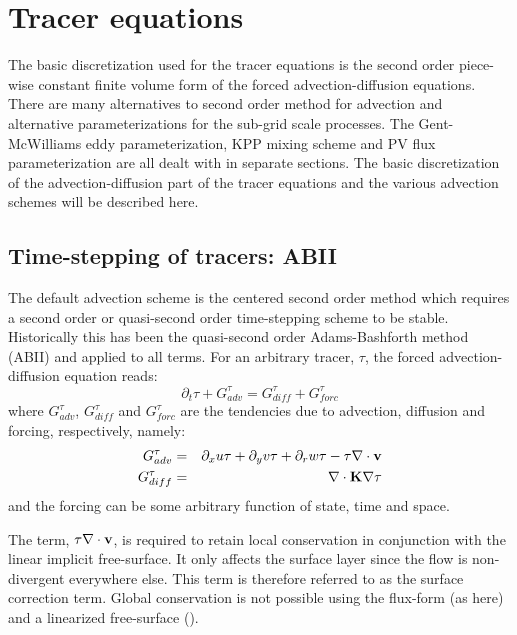 
\section{Tracer equations}
\label{sect:tracer_equations}

The basic discretization used for the tracer equations is the second
order piece-wise constant finite volume form of the forced
advection-diffusion equations. There are many alternatives to second
order method for advection and alternative parameterizations for the
sub-grid scale processes. The Gent-McWilliams eddy parameterization,
KPP mixing scheme and PV flux parameterization are all dealt with in
separate sections. The basic discretization of the advection-diffusion
part of the tracer equations and the various advection schemes will be
described here.

\subsection{Time-stepping of tracers: ABII}
\label{sect:tracer_equations_abII}

The default advection scheme is the centered second order method which
requires a second order or quasi-second order time-stepping scheme to
be stable. Historically this has been the quasi-second order
Adams-Bashforth method (ABII) and applied to all terms. For an
arbitrary tracer, $\tau$, the forced advection-diffusion equation
reads:
\begin{equation}
\partial_t \tau + G_{adv}^\tau = G_{diff}^\tau + G_{forc}^\tau
\end{equation}
where $G_{adv}^\tau$, $G_{diff}^\tau$ and $G_{forc}^\tau$ are the
tendencies due to advection, diffusion and forcing, respectively,
namely:
\begin{eqnarray}
G_{adv}^\tau & = & \partial_x u \tau + \partial_y v \tau + \partial_r w \tau
- \tau \nabla \cdot {\bf v} \\
G_{diff}^\tau & = & \nabla \cdot {\bf K} \nabla \tau
\end{eqnarray}
and the forcing can be some arbitrary function of state, time and
space.

The term, $\tau \nabla \cdot {\bf v}$, is required to retain local
conservation in conjunction with the linear implicit free-surface. It
only affects the surface layer since the flow is non-divergent
everywhere else. This term is therefore referred to as the surface
correction term. Global conservation is not possible using the
flux-form (as here) and a linearized free-surface
(\cite{griffies:00,campin:02}).

